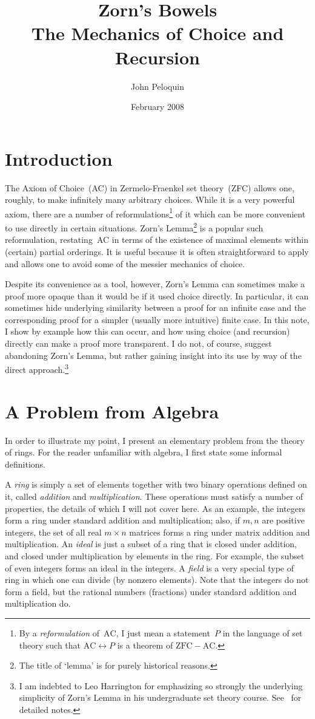\documentclass[letterpaper]{article}
\title{Zorn's Bowels\\The Mechanics of Choice and Recursion}
\author{John Peloquin}
\date{February 2008}
\newcommand{\AC}{\mathrm{AC}}
\newcommand{\ZFC}{\mathrm{ZFC}}
\newcommand{\liff}{\leftrightarrow}
\begin{document}
\maketitle
\section*{Introduction}
The Axiom of Choice~(AC) in Zermelo-Fraenkel set theory~(ZFC) allows one, roughly, to make infinitely many arbitrary choices. While it is a very powerful axiom, there are a number of reformulations\footnote{By a \emph{reformulation} of~$\AC$, I just mean a statement~$P$ in the language of set theory such that $\AC\liff P$ is a theorem of $\ZFC-\AC$.} of it which can be more convenient to use directly in certain situations. Zorn's Lemma\footnote{The title of `lemma' is for purely historical reasons.} is a popular such reformulation, restating~AC in terms of the existence of maximal elements within (certain) partial orderings. It is useful because it is often straightforward to apply and allows one to avoid some of the messier mechanics of choice.

Despite its convenience as a tool, however, Zorn's Lemma can sometimes make a proof more opaque than it would be if it used choice directly. In particular, it can sometimes hide underlying similarity between a proof for an infinite case and the corresponding proof for a simpler (usually more intuitive) finite case. In this note, I show by example how this can occur, and how using choice (and recursion) directly can make a proof more transparent. I do not, of course, suggest abandoning Zorn's Lemma, but rather gaining insight into its use by way of the direct approach.\footnote{I am indebted to Leo Harrington for emphasizing so strongly the underlying simplicity of Zorn's Lemma in his undergraduate set theory course. See~\cite{harrington07} for detailed notes.}

\section*{A Problem from Algebra}
In order to illustrate my point, I present an elementary problem from the theory of rings. For the reader unfamiliar with algebra, I first state some informal definitions.

A \emph{ring} is simply a set of elements together with two binary operations defined on it, called \emph{addition} and \emph{multiplication}. These operations must satisfy a number of properties, the details of which I will not cover here. As an example, the integers form a ring under standard addition and multiplication; also, if $m,n$ are positive integers, the set of all real $m\times n$ matrices forms a ring under matrix addition and multiplication. An \emph{ideal} is just a subset of a ring that is closed under addition, and closed under multiplication by elements in the ring. For example, the subset of even integers forms an ideal in the integers. A \emph{field} is a very special type of ring in which one can divide (by nonzero elements). Note that the integers do not form a field, but the rational numbers (fractions) under standard addition and multiplication do.
\end{document}
